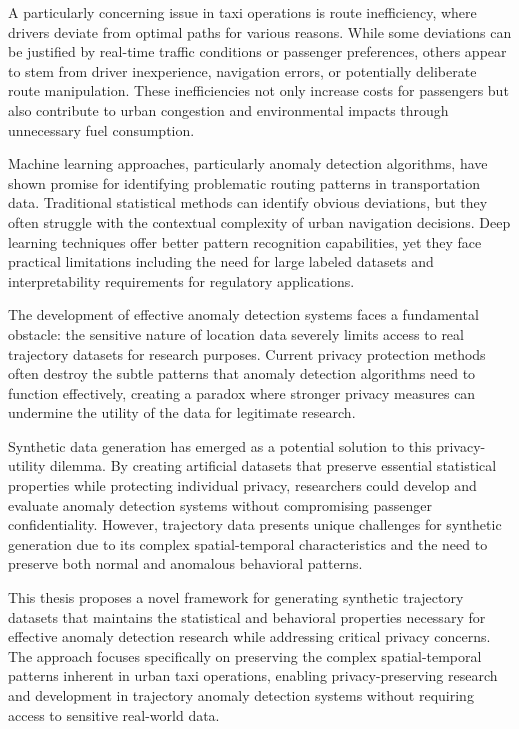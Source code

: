 \documentclass[runningheads]{llncs}
\begin{document}
A particularly concerning issue in taxi operations is route inefficiency, where drivers deviate from optimal paths for various reasons. While some deviations can be justified by real-time traffic conditions or passenger preferences, others appear to stem from driver inexperience, navigation errors, or potentially deliberate route manipulation. These inefficiencies not only increase costs for passengers but also contribute to urban congestion and environmental impacts through unnecessary fuel consumption.

Machine learning approaches, particularly anomaly detection algorithms, have shown promise for identifying problematic routing patterns in transportation data. Traditional statistical methods can identify obvious deviations, but they often struggle with the contextual complexity of urban navigation decisions. Deep learning techniques offer better pattern recognition capabilities, yet they face practical limitations including the need for large labeled datasets and interpretability requirements for regulatory applications.

The development of effective anomaly detection systems faces a fundamental obstacle: the sensitive nature of location data severely limits access to real trajectory datasets for research purposes. Current privacy protection methods often destroy the subtle patterns that anomaly detection algorithms need to function effectively, creating a paradox where stronger privacy measures can undermine the utility of the data for legitimate research.

Synthetic data generation has emerged as a potential solution to this privacy-utility dilemma. By creating artificial datasets that preserve essential statistical properties while protecting individual privacy, researchers could develop and evaluate anomaly detection systems without compromising passenger confidentiality. However, trajectory data presents unique challenges for synthetic generation due to its complex spatial-temporal characteristics and the need to preserve both normal and anomalous behavioral patterns.

This thesis proposes a novel framework for generating synthetic trajectory datasets that maintains the statistical and behavioral properties necessary for effective anomaly detection research while addressing critical privacy concerns. The approach focuses specifically on preserving the complex spatial-temporal patterns inherent in urban taxi operations, enabling privacy-preserving research and development in trajectory anomaly detection systems without requiring access to sensitive real-world data.
\end{document}
